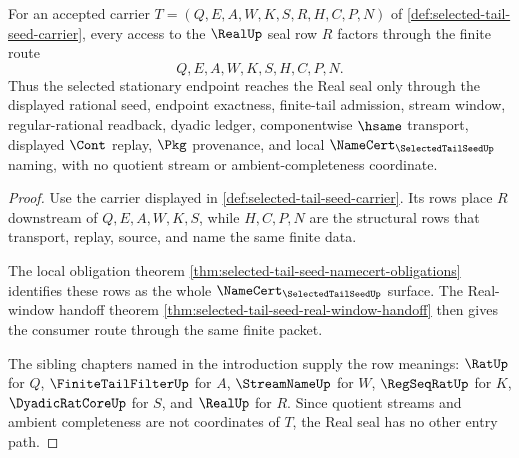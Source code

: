 \begin{theorem}
\label{thm:selected-tail-seed-real-seal-handoff}
For an accepted carrier $T=(Q,E,A,W,K,S,R,H,C,P,N)$ of \autoref{def:selected-tail-seed-carrier}, every access to the $\RealUp$ seal row $R$ factors through the finite route
$$
Q,E,A,W,K,S,H,C,P,N.
$$
Thus the selected stationary endpoint reaches the Real seal only through the displayed rational seed, endpoint exactness, finite-tail admission, stream window, regular-rational readback, dyadic ledger, componentwise $\hsame$ transport, displayed $\Cont$ replay, $\Pkg$ provenance, and local $\NameCert_{\SelectedTailSeedUp}$ naming, with no quotient stream or ambient-completeness coordinate.
\end{theorem}
\begin{proof}
Use the carrier displayed in \autoref{def:selected-tail-seed-carrier}. Its rows place $R$ downstream of $Q,E,A,W,K,S$, while $H,C,P,N$ are the structural rows that transport, replay, source, and name the same finite data.

The local obligation theorem \autoref{thm:selected-tail-seed-namecert-obligations} identifies these rows as the whole $\NameCert_{\SelectedTailSeedUp}$ surface. The Real-window handoff theorem \autoref{thm:selected-tail-seed-real-window-handoff} then gives the consumer route through the same finite packet.

The sibling chapters named in the introduction supply the row meanings: $\RatUp$ for $Q$, $\FiniteTailFilterUp$ for $A$, $\StreamNameUp$ for $W$, $\RegSeqRatUp$ for $K$, $\DyadicRatCoreUp$ for $S$, and $\RealUp$ for $R$. Since quotient streams and ambient completeness are not coordinates of $T$, the Real seal has no other entry path.
\end{proof}

